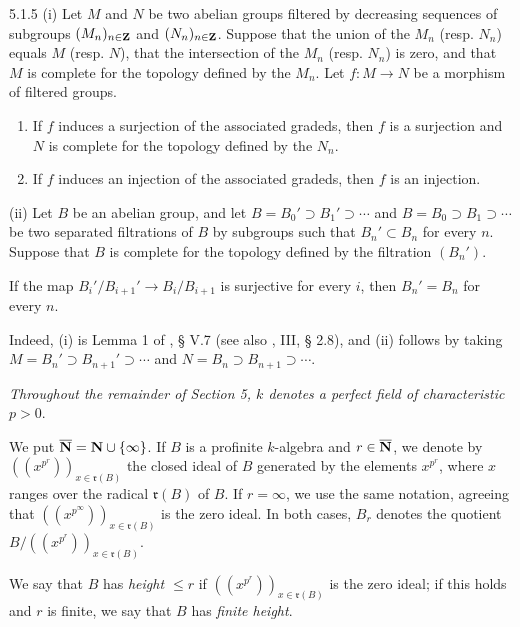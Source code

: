\begin{lemma}{5.1.5}\label{VIIB.5.1.5}
(i) Let $M$ and $N$ be two abelian groups filtered by decreasing sequences of subgroups $(M_n)_{n\in\mathbf{Z}}$ and $(N_n)_{n\in\mathbf{Z}}$. Suppose that the union of the $M_n$ (resp. $N_n$) equals $M$ (resp. $N$), that the intersection of the $M_n$ (resp. $N_n$) is zero, and that $M$ is complete for the topology defined by the $M_n$. Let $f:M\to N$ be a morphism of filtered groups.
\begin{enumerate}
\item[a)] If $f$ induces a surjection of the associated gradeds, then $f$ is a surjection and $N$ is complete for the topology defined by the $N_n$.
\item[b)] If $f$ induces an injection of the associated gradeds, then $f$ is an injection.
\end{enumerate}
(ii) Let $B$ be an abelian group, and let $B=B_0'\supset B_1'\supset\cdots$ and $B=B_0\supset B_1\supset\cdots$ be two separated filtrations of $B$ by subgroups such that $B_n'\subset B_n$ for every $n$. Suppose that $B$ is complete for the topology defined by the filtration $(B_n')$.

If the map $B_i'/B_{i+1}'\to B_i/B_{i+1}$ is surjective for every $i$, then $B_n'=B_n$ for every $n$.
\end{lemma}
Indeed, (i) is Lemma 1 of \cite{CA}, § V.7 (see also \cite{BAC}, III, § 2.8), and (ii) follows by taking $M=B_n'\supset B_{n+1}'\supset\cdots$ and $N=B_n\supset B_{n+1}\supset\cdots$.

\emph{Throughout the remainder of Section 5, $k$ denotes a perfect field of characteristic $p>0$}.

We put $\overline{\mathbf{N}}=\mathbf{N}\cup\{\infty\}$. If $B$ is a profinite $k$-algebra and $r\in\overline{\mathbf{N}}$, we denote by $((x^{p^r}))_{x\in\mathfrak r(B)}$ the closed ideal of $B$ generated by the elements $x^{p^r}$, where $x$ ranges over the radical $\mathfrak r(B)$ of $B$. If $r=\infty$, we use the same notation, agreeing that $((x^{p^\infty}))_{x\in\mathfrak r(B)}$ is the zero ideal. In both cases, $B_r$ denotes the quotient $B/((x^{p^r}))_{x\in\mathfrak r(B)}$.

We say that $B$ has \emph{height $\le r$} if $((x^{p^r}))_{x\in\mathfrak r(B)}$ is the zero ideal; if this holds and $r$ is finite, we say that $B$ has \emph{finite height}.

